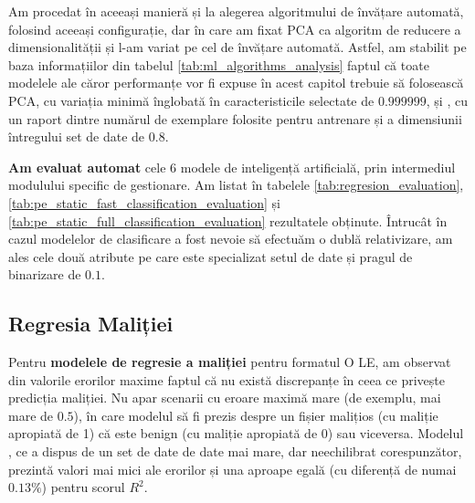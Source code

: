 \documentclass[../../main.tex]{subfiles}
\begin{document}
Am procedat în aceeași manieră și la alegerea algoritmului de învățare a\-utomată, folosind aceeași configurație, dar în care am fixat PCA ca algoritm de reducere a dimensionalității și l-am variat pe cel de învățare automată. Astfel, am stabilit pe baza informațiilor din tabelul \ref{tab:ml_algorithms_analysis} faptul că toate modelele ale căror performanțe vor fi expuse în acest capitol trebuie să folosească PCA, cu variația minimă înglobată în caracteristicile selectate de $ 0.999999 $, și , cu un raport dintre numărul de exemplare folosite pentru antrenare și a dimensiunii întregului set de date de $ 0.8 $.

\textbf{Am evaluat automat} cele 6 modele de inteligență artificială, prin intermediul modulului specific de gestionare. Am listat în tabelele \ref{tab:regresion_evaluation}, \ref{tab:pe_static_fast_classification_evaluation} și \ref{tab:pe_static_full_classification_evaluation} rezultatele obținute. Întrucât în cazul modelelor de clasificare a fost nevoie să efectuăm o dublă relativizare, am ales cele două atribute pe care este specializat setul de date  și pragul de binarizare de $ 0.1 $.

\begin{landscape}
    \vspace*{\fill}
    
    
    
    \vspace*{\fill}
\end{landscape}


\vspace{0.3cm}


\subsection{Regresia Maliției}

Pentru \textbf{modelele de regresie a maliției} pentru formatul O LE, am observat din valorile erorilor maxime faptul că nu există discrepanțe în ceea ce privește predicția maliției. Nu apar scenarii cu eroare maximă mare (de exemplu, mai mare de $ 0.5 $), în care modelul să fi prezis despre un fișier malițios (cu maliție apropiată de 1) că este benign (cu maliție apropiată de 0) sau viceversa. Modelul , ce a dispus de un set de date de date mai mare, dar neechilibrat corespunzător, prezintă valori mai mici ale erorilor și una aproape egală (cu diferență de numai $ 0.13\% $) pentru scorul $ R^2 $.
\end{document}
